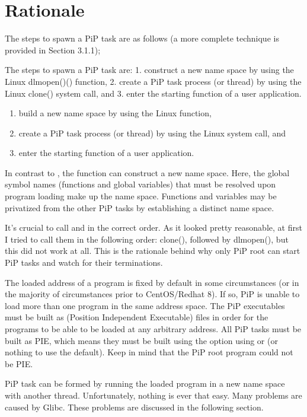 
\section{Rationale}\label{sec:rationale}

The steps to spawn a PiP task are as follows (a more complete
technique is provided in Section 3.1.1);

The steps to spawn a PiP task are: 1. construct a new name space by
using the Linux dlmopen()() function, 2. create a PiP task process (or
thread) by using the Linux clone() system call, and 3. enter the
starting function of a user application.


\begin{enumerate}
\item build a new name space by
using the Linux  function,
\item create a PiP task process (or
thread) by using the Linux  system call, and
\item enter the starting function of a user application.
\end{enumerate}

In contrast to , the  function
can construct a new name space. Here, the global symbol names
(functions and global variables) that must be resolved upon program
loading make up the name space. Functions and variables may be
privatized from the other PiP tasks by establishing a distinct name
space. 

It's crucial to call  and  in the
correct order. As it looked pretty reasonable, at first I tried to
call them in the following order: clone(), followed by dlmopen(), but
this did not work at all. This is the rationale behind why only PiP
root can start PiP tasks and watch for their terminations. 

The loaded address of a program is fixed by default in some
circumstances (or in the majority of circumstances prior to
CentOS/Redhat 8). If so, PiP is unable to load more than one program
in the same address space. The PiP executables must be built as \PIE
(Position Independent Executable) files in order for the programs to
be able to be loaded at any arbitrary address. All PiP tasks must be
built as PIE, which means they must be built using the
 option using  or
 (or nothing to use the default). Keep in mind 
that the PiP root program could not be PIE.

PiP task can be formed by running the loaded program in a new name
space with another thread. Unfortunately, nothing is ever that
easy. Many problems are caused by Glibc. These problems are discussed
in the following section.

